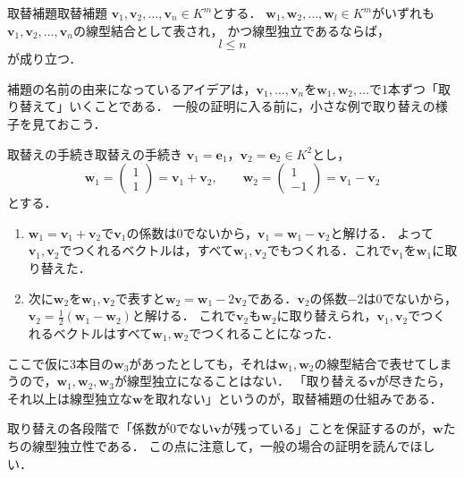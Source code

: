 \begin{lemma}{取替補題}{取替補題}
  $\bm{v}_1, \bm{v}_2, \dots, \bm{v}_n \in K^m$とする．
  $\bm{w}_1, \bm{w}_2, \dots, \bm{w}_l \in K^m$がいずれも$\bm{v}_1, \bm{v}_2, \dots, \bm{v}_n$の線型結合として表され，
  かつ線型独立であるならば，
  \[
    l \le n
  \]
  が成り立つ．
\end{lemma}

補題の名前の由来になっているアイデアは，$\bm{v}_1, \dots, \bm{v}_n$を$\bm{w}_1, \bm{w}_2, \dots$で$1$本ずつ「取り替えて」いくことである．
一般の証明に入る前に，小さな例で取り替えの様子を見ておこう．

\begin{example}{取替えの手続き}{取替えの手続き}
  $\bm{v}_1 = \bm{e}_1$，$\bm{v}_2 = \bm{e}_2 \in K^2$とし，
  \[
    \bm{w}_1 = \begin{pmatrix} 1 \\ 1 \end{pmatrix} = \bm{v}_1 + \bm{v}_2, \qquad
    \bm{w}_2 = \begin{pmatrix} 1 \\ -1 \end{pmatrix} = \bm{v}_1 - \bm{v}_2
  \]
  とする．
  \begin{enumerate}[label=(\arabic*),leftmargin=3.2em]
    \item $\bm{w}_1 = \bm{v}_1 + \bm{v}_2$で$\bm{v}_1$の係数は$0$でないから，$\bm{v}_1 = \bm{w}_1 - \bm{v}_2$と解ける．
      よって$\bm{v}_1, \bm{v}_2$でつくれるベクトルは，すべて$\bm{w}_1, \bm{v}_2$でもつくれる．これで$\bm{v}_1$を$\bm{w}_1$に取り替えた．
    \item 次に$\bm{w}_2$を$\bm{w}_1, \bm{v}_2$で表すと$\bm{w}_2 = \bm{w}_1 - 2\bm{v}_2$である．$\bm{v}_2$の係数$-2$は$0$でないから，$\bm{v}_2 = \frac{1}{2}(\bm{w}_1 - \bm{w}_2)$と解ける．
      これで$\bm{v}_2$も$\bm{w}_2$に取り替えられ，$\bm{v}_1, \bm{v}_2$でつくれるベクトルはすべて$\bm{w}_1, \bm{w}_2$でつくれることになった．
  \end{enumerate}
  ここで仮に$3$本目の$\bm{w}_3$があったとしても，それは$\bm{w}_1, \bm{w}_2$の線型結合で表せてしまうので，$\bm{w}_1, \bm{w}_2, \bm{w}_3$が線型独立になることはない．
  「取り替える$\bm{v}$が尽きたら，それ以上は線型独立な$\bm{w}$を取れない」というのが，取替補題の仕組みである．
\end{example}

取り替えの各段階で「係数が$0$でない$\bm{v}$が残っている」ことを保証するのが，$\bm{w}$たちの線型独立性である．
この点に注意して，一般の場合の証明を読んでほしい．

